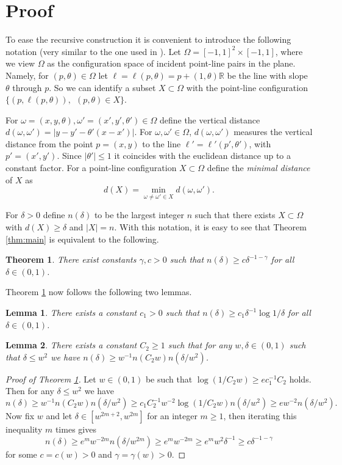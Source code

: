 \documentclass[11pt,letterpaper]{amsart}
\newtheorem{theorem}{Theorem}[section]
\newtheorem{lemma}{Lemma}[section]
\renewcommand{\le}{\leqslant}
\renewcommand{\ge}{\geqslant}
\def\R{\mathbb R}
\def\d{\delta}
\begin{document}
\section{Proof}

To ease the recursive construction it is convenient to introduce the following notation (very similar to the one used in \cite{cohen2025lower}). 
Let $\Omega = [-1,1]^2\times [-1,1]$, where we view $\Omega$ as the configuration space of incident point-line pairs in the plane. Namely, for $(p, \theta) \in \Omega$ let $\ell =\ell(p, \theta) = p + (1,\theta) \R$ be the line with slope $\theta$ through $p$. So we can identify a subset $X \subset \Omega$ with the point-line configuration $\{(p, \ell(p, \theta)), ~~(p, \theta)\in X\}$.

For $\omega=(x,y, \theta), \omega'=(x', y', \theta') \in \Omega$ define the vertical distance $d(\omega, \omega') = |y - y' -\theta'(x-x') |$. For $\omega, \omega'\in \Omega$, $d(\omega, \omega')$ measures the vertical distance from the point $p=(x, y)$ to the line $\ell' = \ell'(p', \theta')$, with $p'=(x', y')$. Since $|\theta'| \le 1$ it coincides with the euclidean distance up to a constant factor. 
For a point-line configuration $X \subset \Omega$ define the {\em minimal distance} of $X$ as
\[
d(X) = \min_{\omega\neq \omega'\in X} d(\omega, \omega').
\]

For $\d>0$ define $n(\d)$ to be the largest integer $n$ such that there exists $X \subset \Omega$ with $d(X) \ge \d$ and $|X| = n$. With this notation, it is easy to see that Theorem \ref{thm:main} is equivalent to the following.

\begin{theorem}\label{thm}
    There exist constants $\gamma,c>0$ such that $n(\d) \ge c\d^{-1-\gamma}$ for all $\d\in (0,1)$. 
\end{theorem}

Theorem \ref{thm} now follows the following two lemmas.

\begin{lemma}\label{lem1}
    There exists a constant $c_1>0$ such that $n(\d) \ge c_1 \d^{-1} \log 1/\d$ for all $\d\in (0,1)$.
\end{lemma}

\begin{lemma}\label{lem2}
    There exists a constant $C_2\ge 1$ such that for any $w, \d \in (0,1)$ such that $\d \le w^2$ we have $n(\d) \ge w^{-1} n(C_2w)n(\d/w^2)$.
\end{lemma}

\begin{proof}[Proof of Theorem \ref{thm}]
    Let $w\in (0,1)$ be such that $\log (1/C_2w)\ge e c_1^{-1} C_2$ holds. Then for any $\d \le w^{2}$ we have
    \[
    n(\d) \ge w^{-1} n(C_2 w) n(\d/w^2) \ge c_1 C_2^{-1}w^{-2} \log(1/C_2w)n(\d/w^2) \ge e w^{-2} n(\d/w^2).
    \]
    Now fix $w$ and let $\d \in [w^{2m+2}, w^{2m}]$ for an integer $m\ge 1$, then iterating this inequality $m$ times gives
    \[
    n(\d) \ge e^m w^{-2m} n(\d/w^{2m}) \ge e^m w^{-2m} \ge e^m w^2 \d^{-1} \ge c \d^{-1-\gamma}
    \]
    for some $c=c(w)>0$ and $\gamma=\gamma(w)>0$.
\end{proof}
\end{document}
